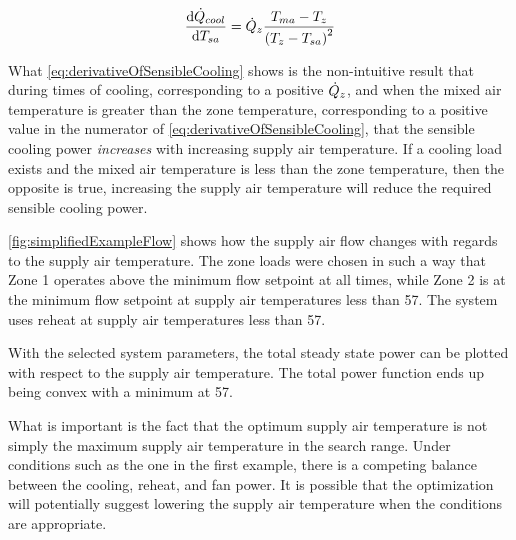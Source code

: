 \begin{equation}\label{eq:derivativeOfSensibleCooling}
    \dv{\dot{Q}_{cool}}{T_{sa}} = \dot{Q}_{z} \frac{T_{ma} -
    T_{z}}{\left(T_{z} - T_{sa}\right)^{2}}
\end{equation}

What  \ref{eq:derivativeOfSensibleCooling} shows is the
non-intuitive result that during times of cooling, corresponding to a
positive \(\dot{Q}_{z}\), and when the mixed air temperature is
greater than the zone temperature, corresponding to a positive value in
the numerator of  \ref{eq:derivativeOfSensibleCooling}, that
the sensible cooling power \textit{increases} with increasing supply air
temperature. If a cooling load exists and the mixed air temperature is
less than the zone temperature, then the opposite is true, increasing
the supply air temperature will reduce the required sensible cooling
power.

\figref{} \ref{fig:simplifiedExampleFlow} shows how the supply air flow
changes with regards to the supply air temperature. The zone loads were
chosen in such a way that Zone 1 operates above the minimum flow
setpoint at all times, while Zone 2 is at the minimum flow setpoint at
supply air temperatures less than \SI{57}{\degreeF}. The system uses
reheat at supply air temperatures less than \SI{57}{\degreeF}. 

With the selected system parameters, the total steady state power can be
plotted with respect to the supply air temperature. The total power
function ends up being convex with a minimum at \SI{57}{\degreeF}. 

What is important is the fact that the optimum supply air temperature is
not simply the maximum supply air temperature in the search range. Under
conditions such as the one in the first example, there is a competing
balance between the cooling, reheat, and fan power. It is possible that
the optimization will potentially suggest lowering the supply air
temperature when the conditions are appropriate.


